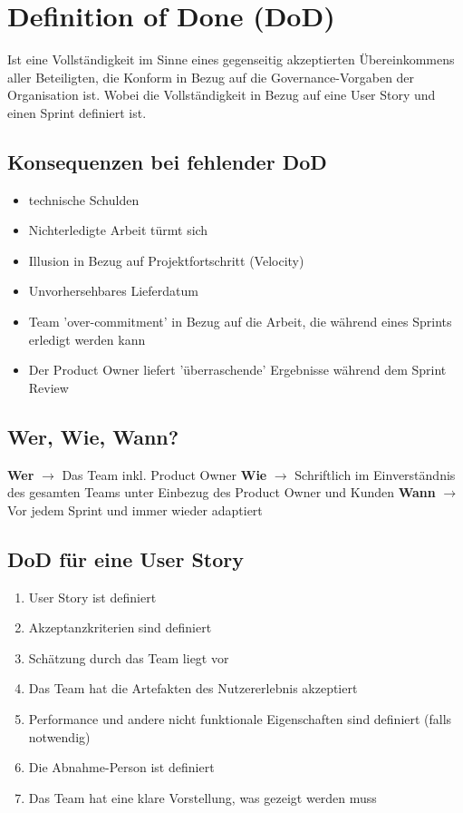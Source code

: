 \documentclass{report}
\theoremstyle{definition}
\theoremstyle{example}
\begin{document}
\section{Definition of Done (DoD)}
Ist eine Vollständigkeit im Sinne eines gegenseitig akzeptierten Übereinkommens aller Beteiligten, die Konform in Bezug auf die Governance-Vorgaben der Organisation ist. Wobei die Vollständigkeit in Bezug auf eine User Story und einen Sprint definiert ist.
\subsection{Konsequenzen bei fehlender DoD}
\begin{itemize}
	\item technische Schulden
	\item Nichterledigte Arbeit türmt sich
	\item Illusion in Bezug auf Projektfortschritt (Velocity)
	\item Unvorhersehbares Lieferdatum
	\item Team 'over-commitment' in Bezug auf die Arbeit, die während eines Sprints erledigt werden kann
	\item Der Product Owner liefert 'überraschende' Ergebnisse während dem Sprint Review
\end{itemize}

\subsection{Wer, Wie, Wann?}
\textbf{Wer} $\rightarrow$ Das Team inkl. Product Owner
\textbf{Wie} $\rightarrow$ Schriftlich im Einverständnis des gesamten Teams unter Einbezug des Product Owner und Kunden
\textbf{Wann} $\rightarrow$ Vor jedem Sprint und immer wieder adaptiert

\subsection{DoD für eine User Story}
\begin{enumerate}
	\item User Story ist definiert
	\item Akzeptanzkriterien sind definiert
	\item Schätzung durch das Team liegt vor
	\item Das Team hat die Artefakten des Nutzererlebnis akzeptiert
	\item Performance und andere nicht funktionale Eigenschaften sind definiert (falls notwendig)
	\item Die Abnahme-Person ist definiert
	\item Das Team hat eine klare Vorstellung, was gezeigt werden muss
\end{enumerate}
\end{document}
